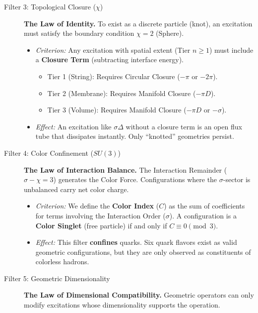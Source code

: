 \begin{description}
    \item[Filter 3: Topological Closure ($\chi$)] \textbf{The Law of Identity.} To exist as a discrete particle (knot), an excitation must satisfy the boundary condition $\chi=2$ (Sphere).
    \begin{itemize}
        \item \textit{Criterion:} Any excitation with spatial extent (Tier $n \ge 1$) must include a \textbf{Closure Term} (subtracting interface energy).
        \begin{itemize}
            \item Tier 1 (String): Requires Circular Closure ($-\pi$ or $-2\pi$).
            \item Tier 2 (Membrane): Requires Manifold Closure ($-\pi D$).
            \item Tier 3 (Volume): Requires Manifold Closure ($-\pi D$ or $-\sigma$).
        \end{itemize}
        \item \textit{Effect:} An excitation like $\sigma\Delta$ without a closure term is an open flux tube that dissipates instantly. Only ``knotted'' geometries persist.
    \end{itemize}

    \item[Filter 4: Color Confinement ($SU(3)$)] \textbf{The Law of Interaction Balance.} The Interaction Remainder ($\sigma - \chi = 3$) generates the Color Force. Configurations where the $\sigma$-sector is unbalanced carry net color charge.
    \begin{itemize}
        \item \textit{Criterion:} We define the \textbf{Color Index} ($C$) as the sum of coefficients for terms involving the Interaction Order ($\sigma$). A configuration is a \textbf{Color Singlet} (free particle) if and only if $C \equiv 0 \pmod 3$.
        \item \textit{Effect:} This filter \textbf{confines} quarks. Six quark flavors exist as valid geometric configurations, but they are only observed as constituents of colorless hadrons.
    \end{itemize}

    \item[Filter 5: Geometric Dimensionality] \textbf{The Law of Dimensional Compatibility.} Geometric operators can only modify excitations whose dimensionality supports the operation.
\end{description}

